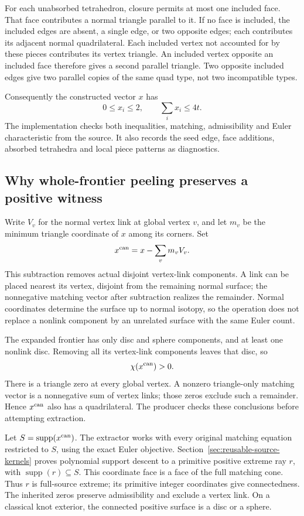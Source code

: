 For each unabsorbed tetrahedron, closure permits at most one included face.
That face contributes a normal triangle parallel to it.  If no face is
included, the included edges are absent, a single edge, or two opposite
edges; each contributes its adjacent normal quadrilateral.  Each included
vertex not accounted for by these pieces contributes its vertex triangle.
An included vertex opposite an included face therefore gives a second
parallel triangle.  Two opposite included edges give two parallel copies
of the same quad type, not two incompatible types.

Consequently the constructed vector $x$ has
\[
 0\le x_i\le2,\qquad \sum_i x_i\le4t.
\]
The implementation checks both inequalities, matching, admissibility and
Euler characteristic from the source.  It also records the seed edge,
face additions, absorbed tetrahedra and local piece patterns as diagnostics.

\subsection{Why whole-frontier peeling preserves a positive witness}

Write $V_v$ for the normal vertex link at global vertex $v$, and let $m_v$
be the minimum triangle coordinate of $x$ among its corners.  Set
\[
 x^{\rm can}=x-\sum_v m_vV_v.
\]
This subtraction removes actual disjoint vertex-link components.  A link
can be placed nearest its vertex, disjoint from the remaining normal
surface; the nonnegative matching vector after subtraction realizes the
remainder.  Normal coordinates determine the surface up to normal isotopy,
so the operation does not replace a nonlink component by an unrelated
surface with the same Euler count.

The expanded frontier has only disc and sphere components, and at least
one nonlink disc.  Removing all its vertex-link components leaves that
disc, so
\[
 \chi(x^{\rm can})>0.
\]
There is a triangle zero at every global vertex.  A nonzero triangle-only
matching vector is a nonnegative sum of vertex links; those zeros exclude
such a remainder.  Hence $x^{\rm can}$ also has a quadrilateral.  The
producer checks these conclusions before attempting extraction.

Let $S=\operatorname{supp}(x^{\rm can})$.  The extractor works with every
original matching equation restricted to $S$, using the exact Euler
objective.  Section~\ref{sec:reusable-source-kernels} proves polynomial
support descent to a primitive positive extreme ray $r$, with
$\operatorname{supp}(r)\subseteq S$.  This coordinate face is a face of
the full matching cone.  Thus $r$ is full-source extreme; its primitive
integer coordinates give connectedness.  The inherited zeros preserve
admissibility and exclude a vertex link.  On a classical knot exterior,
the connected positive surface is a disc or a sphere.


